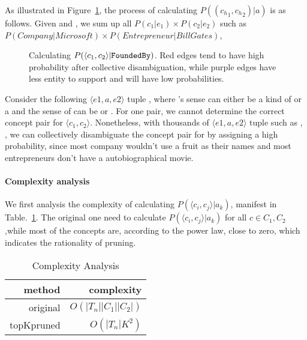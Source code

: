 \begin{example}
\label{exa:pggga}
As illustrated in Figure~\ref{fig:bipartite}, the process of calculating $P(({c_h}_{1},{c_h}_{2}) |a)$ is as follows.
Given  and , we sum up all $P(c_1|e_1)\times P(c_2|e_2) $ such as $P(Company|Microsoft) \times P(Entrepreneur|Bill Gates)$,
\end{example}


\begin{figure}[!htb]
\centering
{}
\caption{\small Calculating $P(  \langle {c}_{1},{c}_{2} \rangle  | {\tt FoundedBy} )$. Red edges tend to have high probability after collective disambiguation, while purple edges have less entity to support and will have low probabilities. }
\label{fig:bipartite}
\end{figure}


\begin{example}
Consider the following $\langle e1,a,e2 \rangle $ tuple , where 's sense can either be a kind of  or a  and the sense of  can be  or .
For one pair, we cannot determine the correct concept pair for $\langle c_1,c_2 \rangle$.
Nonetheless, with thousands of $\langle e1,a,e2 \rangle $ tuple such as , , we can collectively disambiguate the concept pair for  by assigning  a high probability, since most company wouldn't use a fruit as their names and most entrepreneurs don't have a autobiographical movie.
\label{exa:sd}
\end{example}


\paragraph{Complexity analysis}

We first analysis the complexity of calculating $P(\langle c_i, c_j \rangle|a_k)$, manifest in Table.~\ref{tab:complexity}. The original one need to calculate $P(\langle c_i, c_j \rangle|a_k)$ for all $c \in C_1,C_2 $,while most of the concepts are, according to the power law, close to zero, which indicates the rationality of pruning.


\begin{table}[htbp]
  \centering
  \caption{Complexity Analysis}
    \begin{tabular}{rr}
    \toprule
    method & complexity \\
    \midrule
    original &  $O(|T_n||C_1||C_2|)$ \\
    topKpruned & $O(|T_n|K^2)$ \\
    \bottomrule
    \end{tabular}%
  \label{tab:complexity}%
\end{table}%



